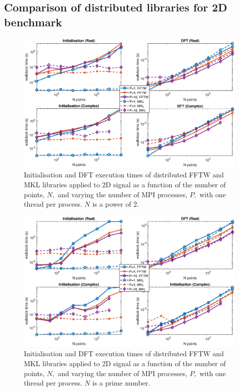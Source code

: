 \documentclass[a4paper]{article}
\begin{document}
\subsection{Comparison of distributed libraries for 2D benchmark}\label{Sec:2DDistComp}


\begin{figure}[htb]
    \centering
    \includegraphics[width=\linewidth]{../results/fftw_mkl_2_2d_mpi.eps}
  \caption{Initialisation and DFT execution times of distributed FFTW and MKL libraries applied to 2D signal as a function of the
    number of points, $N,$ and varying the number of MPI processes, $P,$ with one thread per process. $N$ is a power of 2.}
  \label{2DDistFFTWMKL2}
\end{figure}


\begin{figure}[htb]
    \centering
    \includegraphics[width=\linewidth]{../results/fftw_mkl_prime_2d_mpi.eps}
  \caption{Initialisation and DFT execution times of distributed FFTW and MKL libraries applied to 2D signal as a function of the
    number of points, $N,$ and varying the number of MPI processes, $P,$ with one thread per process. $N$ is a prime number.}
  \label{2DDistFFTWMKLprime}
\end{figure}
\end{document}
